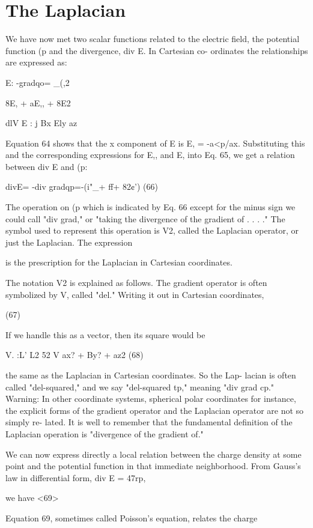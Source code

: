 \section{The Laplacian}

We have now met two scalar functions related to the electric field,
the potential function (p and the divergence, div E. In Cartesian co-
ordinates the relationships are expressed as:

E: -gradqo= _(,2%

8E, + aE,, + 8E2

dlV E : j
Bx Ely az

Equation 64 shows that the x component of E is E, = -a<p/ax.
Substituting this and the corresponding expressions for E,, and E,
into Eq. 65, we get a relation between div E and (p:

divE= -div gradqp=-(i"_+ ff+ 82¢') (66)

The operation on (p which is indicated by Eq. 66 except for the minus
sign we could call "div grad," or "taking the divergence of the
gradient of . . . ." The symbol used to represent this operation is V2,
called the Laplacian operator, or just the Laplacian. The expression

is the prescription for the Laplacian in Cartesian coordinates.

The notation V2 is explained as follows. The gradient operator is
often symbolized by V, called "del." Writing it out in Cartesian
coordinates,

(67)

If we handle this as a vector, then its square would be

V. :L' L2 52
V ax? + By? + az2 (68)

the same as the Laplacian in Cartesian coordinates. So the Lap-
lacian is often called "del-squared," and we say "del-squared tp,"
meaning "div grad cp." Warning: In other coordinate systems,
spherical polar coordinates for instance, the explicit forms of the
gradient operator and the Laplacian operator are not so simply re-
lated. It is well to remember that the fundamental definition of the
Laplacian operation is "divergence of the gradient of."

We can now express directly a local relation between the charge
density at some point and the potential function in that immediate
neighborhood. From Gauss's law in differential form, div E = 47rp,

we have
<69>

Equation 69, sometimes called Poisson's equation, relates the charge

